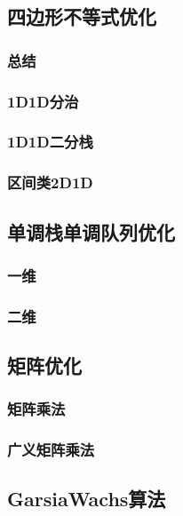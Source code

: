 \documentclass[10pt,a4paper]{article}
\begin{document}
\subsection{四边形不等式优化}
\subsubsection{总结}
\begin{spacing}{1.5}

\end{spacing}
\subsubsection{1D1D分治}

\subsubsection{1D1D二分栈}

\subsubsection{区间类2D1D}

\subsection{单调栈单调队列优化}
\subsubsection{一维}

\subsubsection{二维}

\subsection{矩阵优化}
\subsubsection{矩阵乘法}

\subsubsection{广义矩阵乘法}

\subsection{GarsiaWachs算法}

\end{document}
